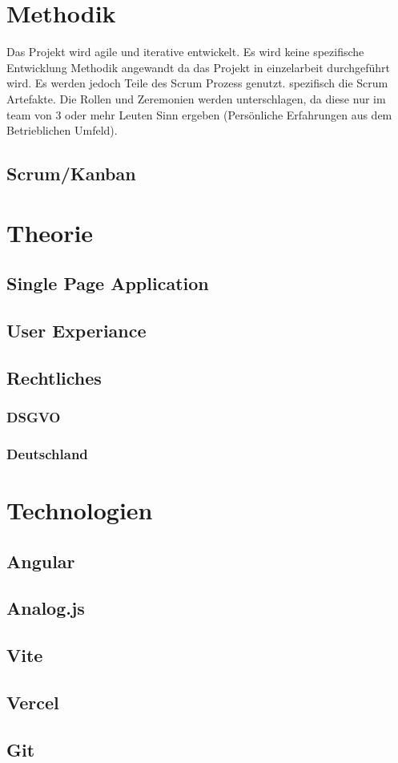 \newpage

\section{Methodik} 
Das Projekt wird agile und iterative entwickelt. Es wird keine spezifische Entwicklung Methodik angewandt
da das Projekt in einzelarbeit durchgeführt wird. Es werden jedoch Teile des Scrum Prozess genutzt. spezifisch
die Scrum Artefakte. Die Rollen und Zeremonien werden unterschlagen, da diese nur im team von 3 oder mehr Leuten
Sinn ergeben (Persönliche Erfahrungen aus dem Betrieblichen Umfeld).
\subsection{ Scrum/Kanban }

\section{Theorie} 
\subsection{ Single Page Application }
\subsection{ User Experiance }
\subsection{ Rechtliches }
\subsubsection{ DSGVO }
\subsubsection{ Deutschland }
\section{Technologien}
\subsection{ Angular }
\subsection{ Analog.js }
\subsection{ Vite }
\subsection{ Vercel }
\subsection{ Git }

